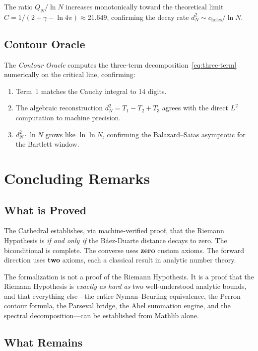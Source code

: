 \documentclass[11pt,a4paper]{article}
\begin{document}
The ratio $Q_N / \ln N$ increases monotonically toward the theoretical
limit $C = 1/(2 + \gamma - \ln 4\pi) \approx 21.649$, confirming
the decay rate $d_N^2 \sim c_{\text{holes}} / \ln N$.

\subsection{Contour Oracle}

The \emph{Contour Oracle} computes the three-term
decomposition~\eqref{eq:three-term} numerically on the critical line,
confirming:
\begin{enumerate}
  \item Term~1 matches the Cauchy integral to 14 digits.
  \item The algebraic reconstruction $d_N^2 = T_1 - T_2 + T_3$ agrees
    with the direct $L^2$ computation to machine precision.
  \item $d_N^2 \cdot \ln N$ grows like $\ln\ln N$, confirming the
    Balazard--Saias asymptotic for the Bartlett window.
\end{enumerate}

\section{Concluding Remarks}

\subsection{What is Proved}

The Cathedral establishes, via machine-verified proof, that the Riemann
Hypothesis is \emph{if and only if} the B\'aez-Duarte distance decays
to zero. The biconditional is complete. The converse uses \textbf{zero}
custom axioms. The forward direction uses \textbf{two} axioms, each a
classical result in analytic number theory.

The formalization is not a proof of the Riemann Hypothesis. It is
a proof that the Riemann Hypothesis is \emph{exactly as hard as}
two well-understood analytic bounds, and that everything else---the
entire Nyman--Beurling equivalence, the Perron contour formula, the
Parseval bridge, the Abel summation engine, and the spectral
decomposition---can be established from Mathlib alone.

\subsection{What Remains}
\end{document}
